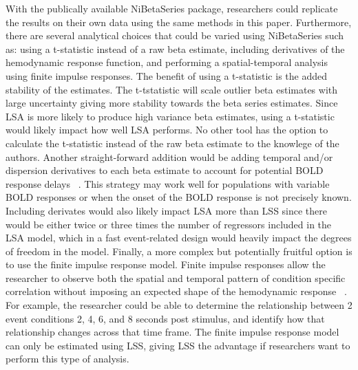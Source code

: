 \documentclass[10pt,letterpaper]{article}
\begin{document}
With the publically available NiBetaSeries package, researchers could replicate the
results on their own data using the same methods in this paper.
Furthermore, there are several analytical choices that could be varied using NiBetaSeries such as:
using a t-statistic instead of a raw beta estimate, including derivatives of the hemodynamic response function,
and performing a spatial-temporal analysis using finite impulse responses.
The benefit of using a t-statistic is the added stability of the estimates.
The t-tstatistic will scale outlier beta estimates with large uncertainty giving more stability
towards the beta series estimates.
Since LSA is more likely to produce high variance beta estimates, using a t-statistic would likely impact
how well LSA performs.
No other tool has the option to calculate the t-statistic instead of the raw beta estimate to the knowlege
of the authors.
Another straight-forward addition would be adding temporal and/or dispersion derivatives to each beta
estimate to account for potential BOLD response delays ~\cite{Calhoun2004,Gottlich2015}.
This strategy may work well for populations with variable BOLD responses or when the onset of the BOLD
response is not precisely known.
Including derivates would also likely impact LSA more than LSS since there would be either twice or
three times the number of regressors included in the LSA model, which in a fast event-related design
would heavily impact the degrees of freedom in the model.
Finally, a more complex but potentially fruitful option is to use the finite impulse response model.
Finite impulse responses allow the researcher to observe both the spatial and temporal pattern of
condition specific correlation without imposing an expected shape of the hemodynamic response ~\cite{Turner2012a}.
For example, the researcher could be able to determine the relationship between 2 event conditions
2, 4, 6, and 8 seconds post stimulus, and identify how that relationship changes across
that time frame.
The finite impulse response model can only be estimated using LSS, giving LSS the advantage if researchers
want to perform this type of analysis.
\end{document}
